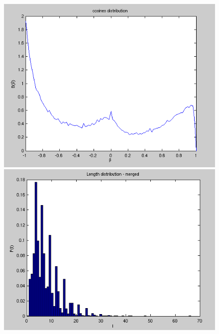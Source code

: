 \begin{figure}[h!]
\begin{minipage}{0.32\textwidth}
\begin{center}
\includegraphics[width=1.0\textwidth]{Figures/chapter-image/avizo/ActinZ39b21l5-histo-cosines.png}%
\end{center}
\end{minipage}
\begin{minipage}{0.32\textwidth}
\begin{center}
\includegraphics[width=1.0\textwidth]{Figures/chapter-image/avizo/ActinZ39b21l8-histo-length.png}%
\end{center}
\end{minipage}
\begin{minipage}{0.32\textwidth}

\end{minipage}
\end{figure}
